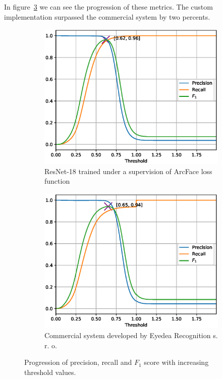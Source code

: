 In figure~\ref{fig:prft} we can see the progression of these metrics.
The custom implementation surpassed the commercial system by two percents.

\begin{figure}[H]
    \begin{subfigure}{\textwidth}
        \centering
        \includegraphics[width=0.95\columnwidth]{images/implementation/prft_fav-128_N1.eps}
        \caption{ResNet-18 trained under a supervision of ArcFace loss function}
        \label{fig:prft_arcface}
    \end{subfigure}%

    \begin{subfigure}{\textwidth}
        \centering
        \includegraphics[width=0.95\columnwidth]{images/implementation/prft_eyedea.eps}
        \caption{Commercial system developed by Eyedea Recognition s. r. o.}
        \label{fig:prft_eyedea}
    \end{subfigure}
    \caption{Progression of precision, recall and $F_1$ score with increasing threshold values.}
    \label{fig:prft}
\end{figure}

